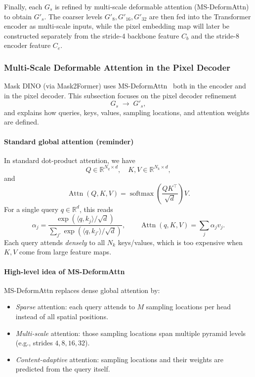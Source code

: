 \begin{enrichment}
\begin{enrichment}
		Finally, each $G_s$ is refined by multi-scale deformable attention (MS-DeformAttn) to obtain $G'_s$. The coarser levels $G'_8, G'_{16}, G'_{32}$ are then fed into the Transformer encoder as multi-scale inputs, while the pixel embedding map will later be constructed separately from the stride-4 backbone feature $C_b$ and the stride-8 encoder feature $C_e$. 
		
		\subsubsection{Multi-Scale Deformable Attention in the Pixel Decoder}
		
		Mask DINO (via Mask2Former) uses MS-DeformAttn~\cite{zhu2021_deformabledetr} both in the encoder and in the pixel decoder. This subsection focuses on the pixel decoder refinement
		\[
		G_s \;\longrightarrow\; G'_s,
		\]
		and explains how queries, keys, values, sampling locations, and attention weights are defined.
		
		\paragraph{Standard global attention (reminder)}
		In standard dot-product attention, we have
		\[
		Q \in \mathbb{R}^{N_q \times d}, \quad
		K, V \in \mathbb{R}^{N_k \times d},
		\]
		and
		\begin{equation}
			\operatorname{Attn}(Q,K,V)
			= \operatorname{softmax}\!\left(\frac{QK^\top}{\sqrt{d}}\right)V.
			\label{eq:chapter15_maskdino_standard_attn}
		\end{equation}
		For a single query $q \in \mathbb{R}^d$, this reads
		\[
		\alpha_j = \frac{\exp(\langle q,k_j\rangle / \sqrt{d})}{\sum_{j'} \exp(\langle q,k_{j'}\rangle / \sqrt{d})},
		\qquad
		\operatorname{Attn}(q,K,V) = \sum_j \alpha_j v_j.
		\]
		Each query attends \emph{densely} to all $N_k$ keys/values, which is too expensive when $K,V$ come from large feature maps.
		
		\paragraph{High-level idea of MS-DeformAttn}
		MS-DeformAttn replaces dense global attention by:
		\begin{itemize}
			\item \emph{Sparse} attention: each query attends to $M$ sampling locations per head instead of all spatial positions.
			\item \emph{Multi-scale} attention: those sampling locations span multiple pyramid levels (e.g., strides $4,8,16,32$).
			\item \emph{Content-adaptive} attention: sampling locations and their weights are predicted from the query itself.
		\end{itemize}
		

\end{enrichment}
\end{enrichment}
